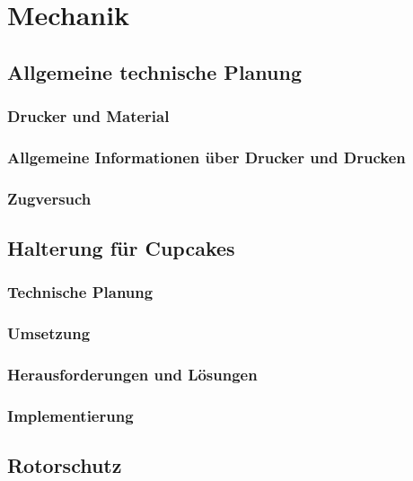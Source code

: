 \chapter{Mechanik}

\renewcommand{\kapitelautor}{Autor: Alexander Punz}

\section{Allgemeine technische Planung}

	\subsection{Drucker und Material}

	\subsection{Allgemeine Informationen über Drucker und Drucken}

	\subsection{Zugversuch}

\section{Halterung für Cupcakes}

	\subsection{Technische Planung}

	\subsection{Umsetzung}

	\subsection{Herausforderungen und Lösungen}

	\subsection{Implementierung}

\section{Rotorschutz}

